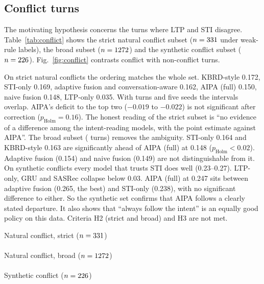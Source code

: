 \subsection{Conflict turns}
The motivating hypothesis concerns the turns where LTP and STI disagree. Table~\ref{tab:conflict} shows the strict natural conflict subset ($n=331$ under weak-rule labels), the broad subset ($n=1272$) and the synthetic conflict subset ($n=226$). Fig.~\ref{fig:conflict} contrasts conflict with non-conflict turns.

On strict natural conflicts the ordering matches the whole set. KBRD-style 0.172, STI-only 0.169, adaptive fusion and conversation-aware 0.162, AIPA (full) 0.150, naive fusion 0.148, LTP-only 0.035. With \nConflictStrict{} turns and five seeds the intervals overlap. AIPA's deficit to the top two ($-0.019$ to $-0.022$) is not significant after correction ($p_{\text{Holm}}=0.16$). The honest reading of the strict subset is ``no evidence of a difference among the intent-reading models, with the point estimate against AIPA''. The broad subset (\nConflictBroad{} turns) removes the ambiguity. STI-only 0.164 and KBRD-style 0.163 are significantly ahead of AIPA (full) at 0.148 ($p_{\text{Holm}}<0.02$). Adaptive fusion (0.154) and naive fusion (0.149) are not distinguishable from it. On synthetic conflicts every model that trusts STI does well (0.23--0.27). LTP-only, GRU and SASRec collapse below 0.03. AIPA (full) at 0.247 sits between adaptive fusion (0.265, the best) and STI-only (0.238), with no significant difference to either. So the synthetic set confirms that AIPA follows a clearly stated departure. It also shows that ``always follow the intent'' is an equally good policy on this data. Criteria H2 (strict and broad) and H3 are not met.

\begin{table}[t]
  \centering
  \caption{Conflict subsets, Hit@10 and companions. Natural conflicts use weak-rule labels. The strict subset is Conflict/Override, the broad subset adds confident genre disagreement. Synthetic conflicts are controlled injections. Same layout as Table~\ref{tab:overall}.}
  \label{tab:conflict}
  \scriptsize
  Natural conflict, strict ($n=331$)\\[2pt]
  \resizebox{\columnwidth}{!}{}\\[6pt]
  Natural conflict, broad ($n=1272$)\\[2pt]
  \resizebox{\columnwidth}{!}{}\\[6pt]
  Synthetic conflict ($n=226$)\\[2pt]
  \resizebox{\columnwidth}{!}{}
\end{table}

